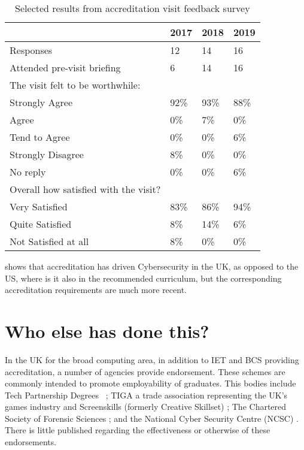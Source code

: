\documentclass[sigconf]{acmart}
\begin{document}
\begin{table}[h!]
  \caption{Selected results from accreditation visit feedback survey}
  \label{table:1}
\begin{tabular}{ | p{5cm}|p{.75cm}|p{.75cm} |p{.75cm} |}
\hline
 & 2017 & 2018 & 2019   \\ \hline
Responses & 12 & 14 & 16   \\
\hline
Attended pre-visit briefing & 6 & 14 & 16   \\
\hline
The visit felt to be worthwhile: & & &  \\
Strongly Agree &92\% & 93\% &88\% \\
Agree &0\% & 7\% &0\% \\
Tend to Agree &0\% & 0\% &6\% \\
Strongly Disagree &8\% & 0\% &0\% \\
No reply &0\% & 0\% &6\% \\
\hline
Overall how satisfied with the visit? & & &  \\
Very Satisfied &83\% & 86\% &94\% \\
Quite Satisfied &8\% & 14\% &6\% \\
Not Satisfied at all &8\% & 0\% &0\% \\
\hline

\end{tabular}%
\end{table}
\cite{Cricketal2019} shows that accreditation has driven Cybersecurity in the UK, as opposed to the US, where is it also in the recommended curriculum, but the corresponding accreditation requirements are much more recent.

\section {Who else has done this?}	

In the UK for the broad computing area, in addition to IET and BCS providing accreditation, a number of agencies provide endorsement. These schemes are commonly intended to promote employability of graduates. This bodies include Tech Partnership Degrees ~\cite{TP2019}; TIGA a trade association representing the UK's games industry and  Screenskills (formerly Creative Skillset) \cite{Screenskills2019}; The Chartered Society of Forensic Sciences \cite{CSOFS2019}; and the National Cyber Security Centre (NCSC) \cite{NCSC2018a}. There is little published regarding the effectiveness or otherwise of these endorsements.
\end{document}
